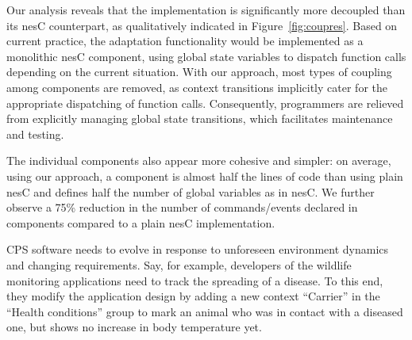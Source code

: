  Our analysis reveals that the
\conesc implementation is significantly more decoupled than its nesC
counterpart, as qualitatively indicated in
Figure~\ref{fig:coupres}. Based on current practice, the adaptation
functionality would be implemented as a monolithic nesC component,
using global state variables to dispatch function calls depending on
the current situation. With our approach, most types of coupling among
components are removed, as context transitions implicitly cater for
the appropriate dispatching of function calls. Consequently,
programmers are relieved from explicitly managing global state
transitions, which facilitates maintenance and testing.

The individual \conesc components also appear more
cohesive and simpler: on average, using our approach, a component is
almost half the lines of code than using plain nesC and defines half
the number of global variables as in nesC. We further observe a 75\%
reduction in the number of commands/events declared in \conesc
components compared to a plain nesC implementation.



 CPS software needs to evolve in
response to unforeseen environment dynamics and changing
requirements. Say, for example, developers of the wildlife monitoring
applications need to track the spreading of a disease. To this end,
they modify the application design by adding a new context ``Carrier''
in the ``Health conditions'' group to mark an animal who was in
contact with a diseased one, but shows no increase in body temperature
yet.

